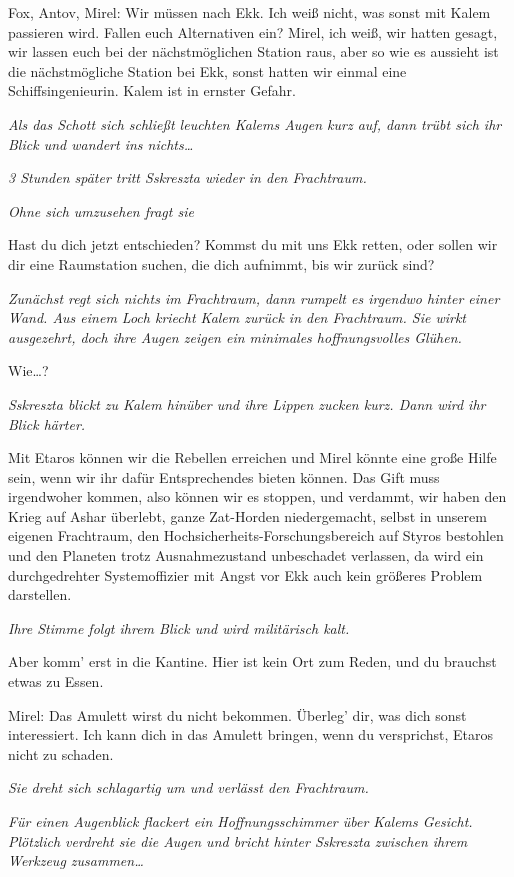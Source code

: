 \documentclass[11pt]{article}
\begin{document}
Fox, Antov, Mirel: Wir müssen nach Ekk. Ich weiß nicht, was sonst mit
Kalem passieren wird. Fallen euch Alternativen ein? Mirel, ich weiß, wir
hatten gesagt, wir lassen euch bei der nächstmöglichen Station raus,
aber so wie es aussieht ist die nächstmögliche Station bei Ekk, sonst
hatten wir einmal eine Schiffsingenieurin. Kalem ist in ernster Gefahr.

\emph{Als das Schott sich schließt leuchten Kalems Augen kurz auf, dann
trübt sich ihr Blick und wandert ins nichts\ldots{}}

\emph{3 Stunden später tritt Sskreszta wieder in den Frachtraum.}

\emph{Ohne sich umzusehen fragt sie}

Hast du dich jetzt entschieden? Kommst du mit uns Ekk retten, oder
sollen wir dir eine Raumstation suchen, die dich aufnimmt, bis wir
zurück sind?

\emph{Zunächst regt sich nichts im Frachtraum, dann rumpelt es irgendwo
hinter einer Wand. Aus einem Loch kriecht Kalem zurück in den
Frachtraum. Sie wirkt ausgezehrt, doch ihre Augen zeigen ein minimales
hoffnungsvolles Glühen.}

Wie\ldots{}?

\emph{Sskreszta blickt zu Kalem hinüber und ihre Lippen zucken kurz.
Dann wird ihr Blick härter.}

Mit Etaros können wir die Rebellen erreichen und Mirel könnte eine große
Hilfe sein, wenn wir ihr dafür Entsprechendes bieten können. Das Gift
muss irgendwoher kommen, also können wir es stoppen, und verdammt, wir
haben den Krieg auf Ashar überlebt, ganze Zat-Horden niedergemacht,
selbst in unserem eigenen Frachtraum, den
Hochsicherheits-Forschungsbereich auf Styros bestohlen und den Planeten
trotz Ausnahmezustand unbeschadet verlassen, da wird ein durchgedrehter
Systemoffizier mit Angst vor Ekk auch kein größeres Problem darstellen.

\emph{Ihre Stimme folgt ihrem Blick und wird militärisch kalt.}

Aber komm' erst in die Kantine. Hier ist kein Ort zum Reden, und du
brauchst etwas zu Essen.

Mirel: Das Amulett wirst du nicht bekommen. Überleg' dir, was dich sonst
interessiert. Ich kann dich in das Amulett bringen, wenn du versprichst,
Etaros nicht zu schaden.

\emph{Sie dreht sich schlagartig um und verlässt den Frachtraum.}

\emph{Für einen Augenblick flackert ein Hoffnungsschimmer über Kalems
Gesicht. Plötzlich verdreht sie die Augen und bricht hinter Sskreszta
zwischen ihrem Werkzeug zusammen\ldots{}}
\end{document}
